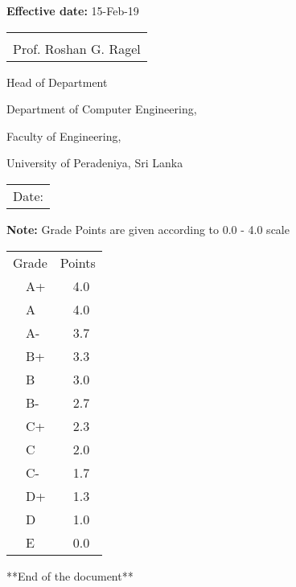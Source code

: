 \documentclass[12pt]{article}
\makeatletter
\newcommand{\sign}[1]{%
  \begin{tabular}[t]{@{}l@{}}
  \makebox[2.5in]{\dotfill}\\
  \strut#1\strut
  \end{tabular}%
}
\newcommand{\Date}{%
  \begin{tabular}[t]{@{}p{2.5in}@{}}
  \\[-2ex]
  \strut Date: \dotfill\strut
  \end{tabular}%
}
\makeatother
\begin{document}
\noindent\textbf{Effective date:} 15-Feb-19

\vspace{45pt}

\noindent
\begin{minipage}[t]{0.5\linewidth}
    \raggedright
    \sign{Prof. Roshan G. Ragel}
    \par
    Head of Department\par
    Department of Computer Engineering, \par
    Faculty of Engineering, \par
    University of Peradeniya, Sri Lanka
\end{minipage}%
\hfill
  \begin{minipage}[t]{0.4\linewidth}
    \Date
  \end{minipage}



\textbf{Note:} Grade Points are given according to 0.0 - 4.0 scale

\begin{table}[H]
\centering
\begin{tabular}{ll}
\multicolumn{1}{c}{Grade} &
\multicolumn{1}{c}{Points}\\
\ \ A+    & \ \ 4.0    \\ 
\ \ A     & \ \ 4.0    \\ 
\ \ A-    & \ \ 3.7    \\ 
\ \ B+    & \ \ 3.3    \\ 
\ \ B    & \ \ 3.0    \\ 
\ \ B-    & \ \ 2.7    \\ 
\ \ C+    & \ \ 2.3    \\ 
\ \ C     & \ \ 2.0    \\ 
\ \ C-    & \ \ 1.7    \\ 
\ \ D+    & \ \ 1.3    \\ 
\ \ D     & \ \ 1.0    \\ 
\ \ E     & \ \ 0.0    \\ 
\end{tabular}
\end{table}

\begin{center}
**End of the document**
\end{center}
\end{document}
